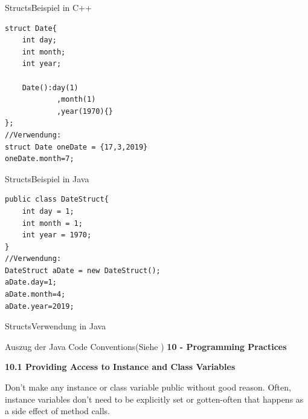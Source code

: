 \begin{frame}[fragile]{Structs}{Beispiel in C++}
\lstset{style=cpp}
\begin{lstlisting}
struct Date{
    int day;
    int month;
    int year;
    
    Date():day(1)
            ,month(1)
            ,year(1970){}
};
//Verwendung:
struct Date oneDate = {17,3,2019}
oneDate.month=7;
\end{lstlisting}
\end{frame}

\begin{frame}[fragile]{Structs}{Beispiel in Java}
\lstset{style=java}
\begin{lstlisting}
public class DateStruct{
    int day = 1;
    int month = 1;
    int year = 1970;
}
//Verwendung:
DateStruct aDate = new DateStruct();
aDate.day=1;
aDate.month=4;
aDate.year=2019;
\end{lstlisting}
\end{frame}

\begin{frame}{Structs}{Verwendung in Java}
    \begin{alertblock}{Auszug der Java Code Conventions(Siehe \cite{orac:cc})}
    \textbf{10 - Programming Practices}
    
    \textbf{10.1 Providing Access to Instance and Class Variables}
    
    Don't make any instance or class variable public without good reason. Often, instance variables don't need to be explicitly set or gotten-often that happens as a side effect of method calls.
    
    \end{alertblock}
\end{frame}

